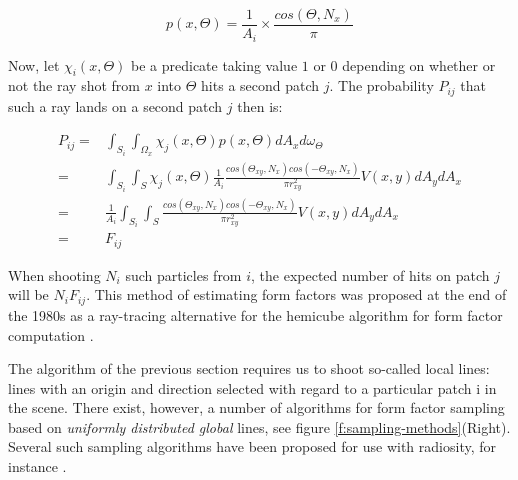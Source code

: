 \begin{equation*}
	p(x,\Theta)=\frac{1}{A_i} \times \frac{cos(\Theta,N_x)}{\pi}
\end{equation*}

Now, let $\chi_i(x,\Theta)$ be a predicate taking value $1$ or $0$ depending on whether or not the ray shot from $x$ into $\Theta$ hits a second patch $j$. The probability $P_{ij}$ that such a ray lands on a second patch $j$ then is:

\begin{equation*}
\begin{aligned}
	P_{ij}=&\int_{S_i}\int_{\Omega_x}\chi_j(x,\Theta)p(x,\Theta)dA_xd\omega_\Theta\\
	=&\int_{S_i}\int_S \chi_j(x,\Theta)\frac{1}{A_i} \frac{cos(\Theta_{xy},N_x)cos(-\Theta_{xy},N_x)}{\pi r^{2}_{xy}} V(x,y)dA_y dA_x\\
	=&\frac{1}{A_i}\int_{S_i}\int_S\frac{cos(\Theta_{xy},N_x)cos(-\Theta_{xy},N_x)}{\pi r^{2}_{xy}} V(x,y)dA_y dA_x\\
	=&F_{ij}
\end{aligned}
\end{equation*}

When shooting $N_i$ such particles from $i$, the expected number of hits on patch $j$ will be $N_iF_{ij}$. This method of estimating form factors was proposed at the end of the 1980s as a ray-tracing alternative for the hemicube algorithm for form factor computation \cite[-16mm]{a:AGeneralTwo-PassMethodIntegratingSpecularandDiffuseReflection} \cite[2mm]{a:ARayTracingMethodforIlluminationCalculationinDiffuse-SpecularScenes}. 

The algorithm of the previous section requires us to shoot so-called local lines: lines with an origin and direction selected with regard to a particular patch i in the scene. There exist, however, a number of algorithms for form factor sampling based on \textit{uniformly distributed global} lines, see figure \ref{f:sampling-methods}(Right). Several such sampling algorithms have been proposed for use with radiosity, for instance \cite[-12mm]{a:TheUseofGlobalRandomDirectionstoComputeRadiosityGlobalMonteCarloTechniques}. 

